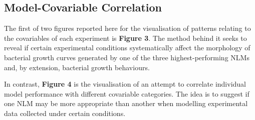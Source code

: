 \documentclass[11pt]{article}
\begin{document}


\subsection{Model-Covariable Correlation}

The first of two figures reported here for the visualisation of patterns relating to the covariables of each experiment is \textbf{Figure 3}. The method behind it seeks to reveal if certain experimental conditions systematically affect the morphology of bacterial growth curves generated by one of the three highest-performing NLMs and, by extension, bacterial growth behaviours.

In contrast, \textbf{Figure 4} is the visualisation of an attempt to correlate individual model performance with different covariable categories. The idea is to suggest if one NLM may be more appropriate than another when modelling experimental data collected under certain conditions.


\end{document}
